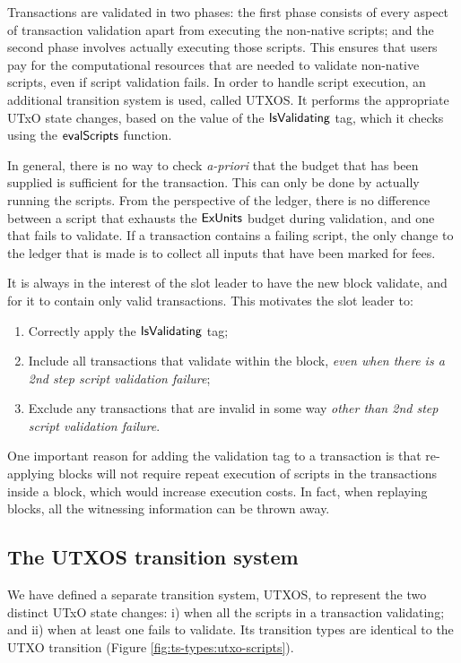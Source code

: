 Transactions are validated in two phases:
the first phase consists of every aspect of transaction validation apart from executing the non-native scripts; and
the second phase involves actually executing those scripts.
This ensures that users pay for the computational resources that are needed to validate non-native scripts, even
if script validation fails. %
In order to handle script execution, an additional transition system is used, called UTXOS.
It performs the appropriate UTxO state changes, based on the
value of the $\mathsf{IsValidating}$ tag, which it checks using the $\mathsf{evalScripts}$ function.

In general, there is no way to check \emph{a-priori} that the budget that has been supplied is sufficient for the transaction.
This can only be done by actually running the scripts. From the perspective of the ledger, there is no difference
between a script that exhausts the $\mathsf{ExUnits}$ budget during validation, and one that fails to validate.
If a transaction contains a failing script, the only change to the ledger that is made
is to collect all inputs that have been marked for fees.

It is always in the interest of the slot leader to have the new block validate,
and for it to contain only valid transactions. This motivates the
slot leader to:

\begin{enumerate}
  \item Correctly apply the $\mathsf{IsValidating}$ tag;
  \item Include all transactions that validate within the block,
  \textit{even when there is a 2nd step script validation failure};
  \item Exclude any transactions that are invalid in some way \textit{other than 2nd step script validation failure}.
\end{enumerate}

One important reason for adding the validation tag
to a transaction is that re-applying blocks will not require repeat
execution of scripts in the transactions inside a block, which would increase execution costs.
In fact, when replaying
blocks, all the witnessing information can be thrown away.

\subsection{The UTXOS transition system}
\label{sec:utxo-state-trans}

We have defined a separate transition system, UTXOS, to represent the two distinct
UTxO state changes: i) when all the scripts in a transaction validating; and
ii) when at least one fails to validate. Its transition types
are identical to the UTXO transition (Figure
\ref{fig:ts-types:utxo-scripts}).

